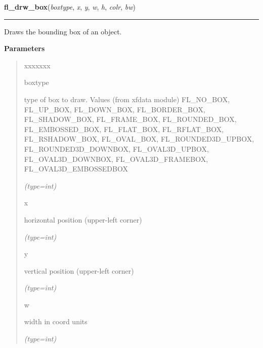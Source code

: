     \label{xformslib:flbasic:fl_drw_box}

    \vspace{0.5ex}

\hspace{.8\funcindent}\begin{boxedminipage}{\funcwidth}

    \raggedright \textbf{fl\_drw\_box}(\textit{boxtype}, \textit{x}, \textit{y}, \textit{w}, \textit{h}, \textit{colr}, \textit{bw})

    \vspace{-1.5ex}

    \rule{\textwidth}{0.5\fboxrule}
\setlength{\parskip}{2ex}
    Draws the bounding box of an object.

\setlength{\parskip}{1ex}
      \textbf{Parameters}
      \vspace{-1ex}

      \begin{quote}
        \begin{Ventry}{xxxxxxx}

          \item[boxtype]

          type of box to draw. Values (from xfdata module) FL\_NO\_BOX, 
          FL\_UP\_BOX, FL\_DOWN\_BOX, FL\_BORDER\_BOX, FL\_SHADOW\_BOX, 
          FL\_FRAME\_BOX, FL\_ROUNDED\_BOX, FL\_EMBOSSED\_BOX, 
          FL\_FLAT\_BOX, FL\_RFLAT\_BOX, FL\_RSHADOW\_BOX, FL\_OVAL\_BOX, 
          FL\_ROUNDED3D\_UPBOX, FL\_ROUNDED3D\_DOWNBOX, FL\_OVAL3D\_UPBOX, 
          FL\_OVAL3D\_DOWNBOX, FL\_OVAL3D\_FRAMEBOX, 
          FL\_OVAL3D\_EMBOSSEDBOX

            {\it (type=int)}

          \item[x]

          horizontal position (upper-left corner)

            {\it (type=int)}

          \item[y]

          vertical position (upper-left corner)

            {\it (type=int)}

          \item[w]

          width in coord units

            {\it (type=int)}


\end{Ventry}
\end{quote}
\end{boxedminipage}

